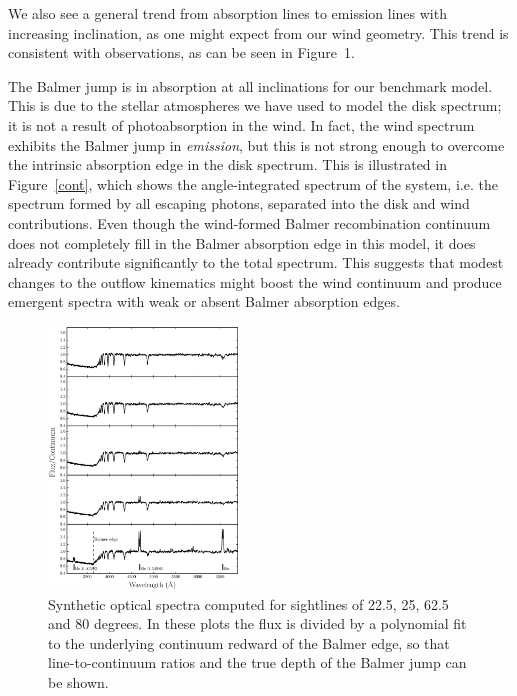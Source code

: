 \documentclass[preprint, a4paper, 11pt]{aastex}
\begin{document}
We also see a general trend from absorption lines to emission lines 
with increasing inclination, as one might expect from our wind
geometry. This trend is consistent with observations, as can be seen
in Figure~1.

The Balmer jump is in absorption at all inclinations for our benchmark
model. This is due to the stellar atmospheres we have used to
model the disk spectrum; it is not a result of photoabsorption in the
wind. In fact, the wind spectrum exhibits the Balmer jump in {\em
emission}, but this is not strong enough to overcome the intrinsic
absorption edge in the disk spectrum. This is illustrated in
Figure~\ref{cont}, which shows the angle-integrated spectrum of the system,
i.e. the spectrum formed by all escaping photons, separated into the
disk and wind contributions. Even though the wind-formed Balmer
recombination continuum does not completely fill in the Balmer
absorption edge in this model, it does already contribute
significantly to the total spectrum. This suggests that modest changes 
to the outflow kinematics might boost the wind continuum and produce
emergent spectra with weak or absent Balmer absorption edges. 

\begin{figure} 
\includegraphics[width=0.45\textwidth]{figures/fig6_opt_cont.eps}
\caption{Synthetic optical spectra computed for 
sightlines of 22.5, 25, 62.5 and 80 degrees. In these plots
the flux is divided by a polynomial fit to the 
underlying continuum redward of the Balmer edge, so that 
line-to-continuum ratios and the true depth of the
Balmer jump can be shown.}
\label{spec_continuum}
\end{figure} 
\end{document}
